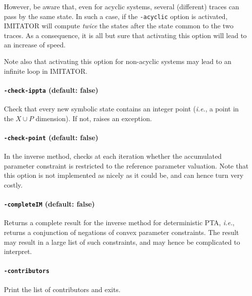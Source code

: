 \documentclass[a4paper,11pt]{report}
\newcommand{\Clock}{X} %
\newcommand{\Param}{P} %
\newcommand{\imitator}{\textsf{IMITATOR}}
\newcommand{\styleOption}[1]{\textcolor{optioncolor}{\texttt{#1}}}
\newcommand{\ie}{\textcolor{colorok}{\textit{i.e.}, }}
\begin{document}
However, be aware that, even for acyclic systems, several (different) traces can pass by the same state.
In such a case, if the \styleOption{-acyclic} option is activated, \imitator{} will compute \emph{twice} the states after the state common to the two traces.
As a consequence, it is all but sure that activating this option will lead to an increase of speed.

Note also that activating this option for non-acyclic systems may lead to an infinite loop in \imitator{}.


\paragraph{\styleOption{-check-ippta} (default: false)}

Check that every new symbolic state contains an integer point (\ie{} a point in the $\Clock \cup \Param$ dimension).
If not, raises an exception.


\paragraph{\styleOption{-check-point} (default: false)}

In the inverse method, checks at each iteration whether the accumulated parameter constraint is restricted to the reference parameter valuation.
Note that this option is not implemented as nicely as it could be, and can hence turn very costly.


\paragraph{\styleOption{-completeIM} (default: false)}

Returns a complete result for the inverse method for deterministic PTA, \ie{} returns a conjunction of negations of convex parameter constraints.
The result may result in a large list of such constraints, and may hence be complicated to interpret.


\paragraph{\styleOption{-contributors}}
Print the list of contributors and exits.
\end{document}
